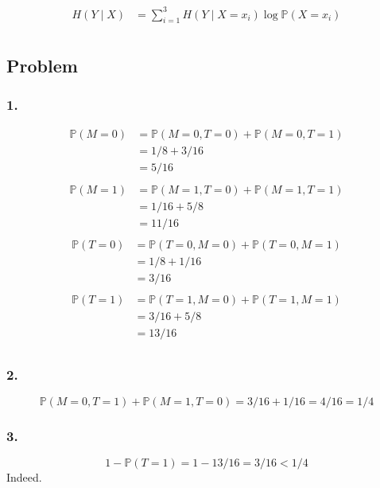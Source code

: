 \documentclass{article}
\newcommand{\1}{\mathbf{1}}
\renewcommand{\P}{\mathbb{P}}
\begin{document}
\begin{align*}
  H(Y \mid X)
   & = \sum_{i=1}^3 H(Y \mid X = x_i) \log \P(X = x_i) \\
\end{align*}

\subsection{Problem}

\subsubsection*{1.}

\begin{align*}
  \P(M = 0)
   & = \P(M = 0, T = 0) + \P(M = 0, T = 1) \\
   & = 1/8 + 3/16                          \\
   & = 5/16                                \\
\end{align*}
\begin{align*}
  \P(M = 1)
   & = \P(M = 1, T = 0) + \P(M = 1, T = 1) \\
   & = 1/16 + 5/8                          \\
   & = 11/16                               \\
\end{align*}
\begin{align*}
  \P(T = 0)
   & = \P(T = 0, M = 0) + \P(T = 0, M = 1) \\
   & = 1/8 + 1/16                          \\
   & = 3/16                                \\
\end{align*}
\begin{align*}
  \P(T = 1)
   & = \P(T = 1, M = 0) + \P(T = 1, M = 1) \\
   & = 3/16 + 5/8                          \\
   & = 13/16                               \\
\end{align*}

\subsubsection*{2.}
$$
  \P(M = 0, T = 1) + \P(M = 1, T = 0) = 3/16 + 1/16 = 4/16 = 1/4
$$

\subsubsection*{3.}
$$
  1 - \P(T = 1) = 1 - 13/16 = 3/16 < 1/4
$$
Indeed.
\end{document}
